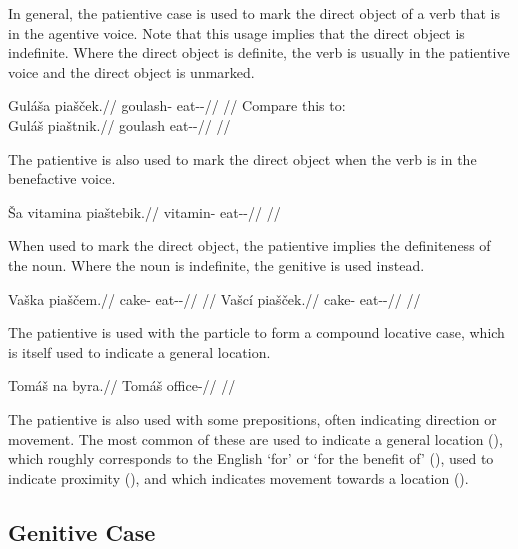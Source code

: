 In general, the patientive case is used to mark the direct object of a verb that is in the agentive voice. Note that this usage implies that the direct object is indefinite. Where the direct object is definite, the verb is usually in the patientive voice and the direct object is unmarked.

\pex
\a \begingl
\gla Guláša piašček.//
\glb goulash-\Acc{} eat-\Av{}-\Pf{}//
\glft {}//
\endgl
\a Compare this to:\\
\begingl
\gla Guláš piaštnik.//
\glb goulash eat-\Pv{}-\Pf{}//
\glft {}//
\endgl
\xe

The patientive is also used to mark the direct object when the verb is in the benefactive voice.

\pex
\begingl
\gla Ša vitamina piaštebik.//
\glb {} vitamin-\Acc{} eat-\Ben{}-\Pf{}//
\glft {}//
\endgl
\xe


When used to mark the direct object, the patientive implies the definiteness of the noun. Where the noun is indefinite, the genitive is used instead.

\pex
\a\begingl
\gla Vaška piaščem.//
\glb cake-\Acc{} eat-\Av{}-\Pf{}//
\glft {}//
\endgl
\a\begingl
\gla Vašcí piašček.//
\glb cake-\Gen{} eat-\Av{}-\Pf{}//
\glft {}//
\endgl
\xe

The patientive is used with the particle  to form a compound locative case, which is itself used to indicate a general location.

\pex
\begingl
\gla Tomáš na byra.//
\glb Tomáš \Loc{} office-\Acc{}//
\glft {}//
\endgl
\xe

The patientive is also used with some prepositions, often indicating direction or movement. The most common of these are  used to indicate a general location (),  which roughly corresponds to the English `for' or `for the benefit of' (),  used to indicate proximity (), and  which indicates movement towards a location ().

\subsection{Genitive Case}

